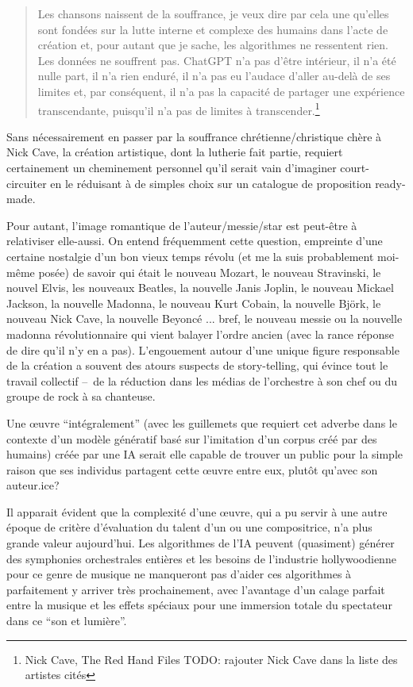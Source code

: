 \begin{quotation}
Les chansons naissent de la souffrance, je veux dire par cela une qu'elles sont fondées sur la lutte interne et complexe des humains dans l'acte de création et, pour autant que je sache, les algorithmes ne ressentent rien. Les données ne souffrent pas. ChatGPT n'a pas d'être intérieur, il n'a été nulle part, il n'a rien enduré, il n'a pas eu l'audace d'aller au-delà de ses limites et, par conséquent, il n'a pas la capacité de partager une expérience transcendante, puisqu'il n'a pas de limites à transcender.\footnote{Nick Cave, The Red Hand Files TODO: rajouter Nick Cave dans la liste des artistes cités}
\end{quotation}

Sans nécessairement en passer par la souffrance chrétienne/christique chère à Nick Cave, la création artistique, dont la lutherie fait partie, requiert certainement un cheminement personnel qu'il serait vain d'imaginer court-circuiter en le réduisant à de simples choix sur un catalogue de proposition ready-made.

Pour autant, l'image romantique de l'auteur/messie/star est peut-être à relativiser elle-aussi. 
On entend fréquemment cette question, empreinte d'une certaine nostalgie d'un bon vieux temps révolu (et me la suis probablement moi-même posée) de savoir qui était le nouveau Mozart, le nouveau Stravinski, le nouvel Elvis, les nouveaux Beatles, la nouvelle Janis Joplin, le nouveau Mickael Jackson, la nouvelle Madonna, le nouveau Kurt Cobain, la nouvelle Björk, le nouveau Nick Cave, la nouvelle Beyoncé ... bref, le nouveau messie ou la nouvelle madonna révolutionnaire qui vient balayer l'ordre ancien (avec la rance réponse de dire qu'il n'y en a pas). 
L'engouement autour d'une unique figure responsable de la création a souvent des atours suspects de story-telling, qui évince tout le travail collectif --~de la réduction dans les médias de l'orchestre à son chef ou du groupe de rock à sa chanteuse.

Une œuvre ``intégralement'' (avec les guillemets que requiert cet adverbe dans le contexte d'un modèle génératif basé sur l'imitation d'un corpus créé par des humains) créée par une IA serait elle capable de trouver un public pour la simple raison que ses individus partagent cette œuvre entre eux, plutôt qu'avec son auteur.ice?


Il apparait évident que la complexité d'une œuvre, qui a pu servir à une autre époque de critère d'évaluation du talent d'un ou une compositrice, n'a plus grande valeur aujourd'hui. Les algorithmes de l'IA peuvent (quasiment) générer des symphonies orchestrales entières et les besoins de l'industrie hollywoodienne pour ce genre de musique ne manqueront pas d'aider ces algorithmes à parfaitement y arriver très prochainement, avec l'avantage d'un calage parfait entre la musique et les effets spéciaux pour une immersion totale du spectateur dans ce ``son et lumière''.

